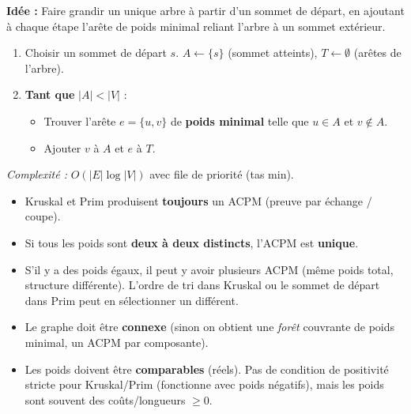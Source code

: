 \documentclass[11pt]{article}
\begin{document}
\begin{methode}
\textbf{Idée :} Faire grandir un unique arbre à partir d'un sommet de départ, en ajoutant à chaque étape l'arête de poids minimal reliant l'arbre à un sommet extérieur.
\begin{enumerate}
    \item Choisir un sommet de départ $s$. $A \leftarrow \{s\}$ (sommet atteints), $T \leftarrow \emptyset$ (arêtes de l'arbre).
    \item \textbf{Tant que} $|A| < |V|$ :
    \begin{itemize}
        \item Trouver l'arête $e = \{u, v\}$ de \textbf{poids minimal} telle que $u \in A$ et $v \notin A$.
        \item Ajouter $v$ à $A$ et $e$ à $T$.
    \end{itemize}
\end{enumerate}
\emph{Complexité :} $O(|E| \log |V|)$ avec file de priorité (tas min).
\end{methode}

\begin{propriete}
\begin{itemize}
    \item Kruskal et Prim produisent \textbf{toujours} un ACPM (preuve par échange / coupe).
    \item Si tous les poids sont \textbf{deux à deux distincts}, l'ACPM est \textbf{unique}.
    \item S'il y a des poids égaux, il peut y avoir plusieurs ACPM (même poids total, structure différente). L'ordre de tri dans Kruskal ou le sommet de départ dans Prim peut en sélectionner un différent.
\end{itemize}
\end{propriete}

\begin{attention}
\begin{itemize}
    \item Le graphe doit être \textbf{connexe} (sinon on obtient une \emph{forêt} couvrante de poids minimal, un ACPM par composante).
    \item Les poids doivent être \textbf{comparables} (réels). Pas de condition de positivité stricte pour Kruskal/Prim (fonctionne avec poids négatifs), mais les poids sont souvent des coûts/longueurs $\ge 0$.
\end{itemize}
\end{attention}
\end{document}
